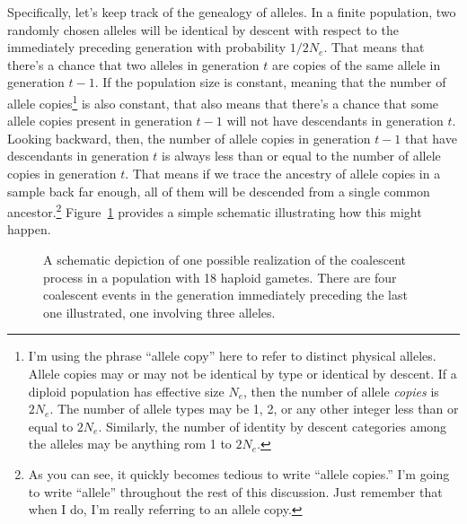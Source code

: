 \documentclass[12pt]{article}
\begin{document}
Specifically, let's keep track of the genealogy of alleles. In a
finite population, two randomly chosen alleles will be identical by
descent with respect to the immediately preceding generation with
probability $1/2N_e$. That means that there's a chance that two
alleles in generation $t$ are copies of the same allele in generation
$t-1$. If the population size is constant, meaning that the number of
allele copies\footnote{I'm using the phrase ``allele copy'' here to
  refer to distinct physical alleles. Allele copies may or may not be
  identical by type or identical by descent. If a diploid population
  has effective size $N_e$, then the number of allele {\it copies\/}
  is $2N_e$. The number of allele types may be 1, 2, or any other
  integer less than or equal to $2N_e$. Similarly, the number of
  identity by descent categories among the alleles may be anything rom
  1 to $2N_e$.} is also constant, that also means
that there's a chance that some allele copies present in generation
$t-1$ will not have descendants in generation $t$. Looking backward,
then, the number of allele copies in generation $t-1$ that have
descendants in generation $t$ is always less than or equal to the
number of allele copies in generation $t$. That means if we trace the
ancestry of allele copies in a sample back far enough, all of them
will be descended from a single common ancestor.\footnote{As you can
  see, it quickly becomes tedious to write ``allele copies.'' I'm
  going to write ``allele'' throughout the rest of this
  discussion. Just remember that when I do, I'm really referring to an
  allele copy.}  Figure~\ref{fig:coalescent} provides a simple
schematic illustrating how this might happen.

\begin{figure}
\begin{center}
\end{center}
\caption{A schematic depiction of one possible realization of the
  coalescent process in a population with 18 haploid gametes. There
  are four coalescent events in the generation immediately preceding
  the last one illustrated, one involving three alleles.}\label{fig:coalescent}
\end{figure}
\end{document}
